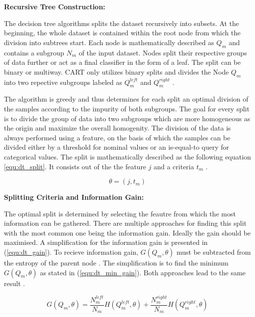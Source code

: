 \textbf{Recursive Tree Construction:} 

The decision tree algorithms splits the dataset recursively into subsets. At the beginning, the whole dataset is 
contained within the root node from which the division into subtrees start. Each node is mathematically described
as \(Q_{m}\) and contains a subgroup \(N_{m}\) of the input dataset. Nodes split their respective groups of data 
further or act as a final classifier in the form of a leaf. The split can be 
binary or multiway. \ac{CART} only utilizes binary splits and divides the Node \(Q_{m}\) into two repective subgroups 
labeled as \(Q^{left}_{m}\) and \(Q^{right}_{m}\) \cite{scikit-decision_tree}.

The algorithm is greedy and thus determines for each split an optimal division of the samples according to 
the impurity of both subgroups. The goal for every split is to divide the group of data into two subgroups which are 
more homogeneous as the origin and maximize the overall homogenity. The division of the data is 
always performed using a feature, on the basis of which the samples can be divided either by a threshold for 
nominal values or an is-equal-to query for categorical values. The split is mathematically described as the 
following equation \ref{equ:dt_split}. It consists out of the the feature \(j\) and a criteria \(t_{m}\) \cite{scikit-decision_tree}.

\begin{equation}
    \theta = (j, t_{m})
    \label{equ:dt_split}
\end{equation}

\textbf{Splitting Criteria and Information Gain:}

The optimal split is determined by selecting the feautre from which the most information can be gathered. There are multiple approaches 
for finding this split with the most common one being the information gain. Ideally the gain should be maximised. A simplification 
for the information gain is presented in (\ref{equ:dt_gain}). To recieve information gain, \(G(Q_{m}, \theta)\) must be subtracted from 
the entropy of the parent node \cite[p.613f]{tangirala2020evaluating}. The simplification is to find the minimum \(G(Q_{m}, \theta)\) as stated in (\ref{equ:dt_min_gain}). Both
approaches lead to the same result \cite{scikit-decision_tree}. 

\begin{equation}
    G(Q_{m},\theta) = \frac{N^{left}_{m}}{N_{m}} H(Q^{left}_{m}, \theta ) + \frac{N^{right}_{m}}{N_{m}} H(Q^{right}_{m}, \theta )
    \label{equ:dt_gain}
\end{equation}

